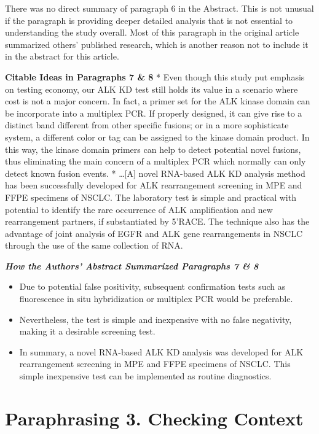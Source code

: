 \documentclass[
]{book}
\providecommand{\tightlist}{%
  \setlength{\itemsep}{0pt}\setlength{\parskip}{0pt}}
\begin{document}
There was no direct summary of paragraph 6 in the Abstract. This is not unusual if the paragraph is providing deeper detailed analysis that is not essential to understanding the study overall. Most of this paragraph in the original article summarized others' published research, which is another reason not to include it in the abstract for this article.

\textbf{Citable Ideas in Paragraphs 7 \& 8}
* Even though this study put emphasis on testing economy, our ALK KD test still holds its value in a scenario where cost is not a major concern. In fact, a primer set for the ALK kinase domain can be incorporate into a multiplex PCR. If properly designed, it can give rise to a distinct band different from other specific fusions; or in a more sophisticate system, a different color or tag can be assigned to the kinase domain product. In this way, the kinase domain primers can help to detect potential novel fusions, thus eliminating the main concern of a multiplex PCR which normally can only detect known fusion events.
* \ldots{[}A{]} novel RNA-based ALK KD analysis method has been successfully developed for ALK rearrangement screening in MPE and FFPE specimens of NSCLC. The laboratory test is simple and practical with potential to identify the rare occurrence of ALK amplification and new rearrangement partners, if substantiated by 5'RACE. The technique also has the advantage of joint analysis of EGFR and ALK gene rearrangements in NSCLC through the use of the same collection of RNA.

\textbf{\emph{How the Authors' Abstract Summarized Paragraphs 7 \& 8}}

\begin{itemize}
\tightlist
\item
  Due to potential false positivity, subsequent confirmation tests such as fluorescence in situ hybridization or multiplex PCR would be preferable.
\item
  Nevertheless, the test is simple and inexpensive with no false negativity, making it a desirable screening test.
\item
  In summary, a novel RNA-based ALK KD analysis was developed for ALK rearrangement screening in MPE and FFPE specimens of NSCLC. This simple inexpensive test can be implemented as routine diagnostics.
\end{itemize}

\hypertarget{paraphrasingthree508}{%
\chapter{Paraphrasing 3. Checking Context}\label{paraphrasingthree508}}
\end{document}
